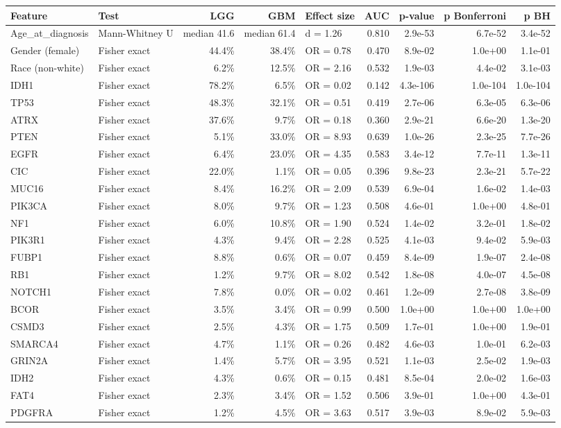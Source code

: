\begin{tabular}{llrrlrrrr}
\toprule
\textbf{Feature} & \textbf{Test} & \textbf{LGG} & \textbf{GBM} & \textbf{Effect size} & \textbf{AUC} & \textbf{p-value} & \textbf{p Bonferroni} & \textbf{p BH} \\
\midrule
Age\_at\_diagnosis & Mann-Whitney U & median 41.6 & median 61.4 & d = 1.26 & 0.810 & 2.9e-53 & 6.7e-52 & 3.4e-52 \\
Gender (female) & Fisher exact & 44.4\% & 38.4\% & OR = 0.78 & 0.470 & 8.9e-02 & 1.0e+00 & 1.1e-01 \\
Race (non-white) & Fisher exact & 6.2\% & 12.5\% & OR = 2.16 & 0.532 & 1.9e-03 & 4.4e-02 & 3.1e-03 \\
IDH1 & Fisher exact & 78.2\% & 6.5\% & OR = 0.02 & 0.142 & 4.3e-106 & 1.0e-104 & 1.0e-104 \\
TP53 & Fisher exact & 48.3\% & 32.1\% & OR = 0.51 & 0.419 & 2.7e-06 & 6.3e-05 & 6.3e-06 \\
ATRX & Fisher exact & 37.6\% & 9.7\% & OR = 0.18 & 0.360 & 2.9e-21 & 6.6e-20 & 1.3e-20 \\
PTEN & Fisher exact & 5.1\% & 33.0\% & OR = 8.93 & 0.639 & 1.0e-26 & 2.3e-25 & 7.7e-26 \\
EGFR & Fisher exact & 6.4\% & 23.0\% & OR = 4.35 & 0.583 & 3.4e-12 & 7.7e-11 & 1.3e-11 \\
CIC & Fisher exact & 22.0\% & 1.1\% & OR = 0.05 & 0.396 & 9.8e-23 & 2.3e-21 & 5.7e-22 \\
MUC16 & Fisher exact & 8.4\% & 16.2\% & OR = 2.09 & 0.539 & 6.9e-04 & 1.6e-02 & 1.4e-03 \\
PIK3CA & Fisher exact & 8.0\% & 9.7\% & OR = 1.23 & 0.508 & 4.6e-01 & 1.0e+00 & 4.8e-01 \\
NF1 & Fisher exact & 6.0\% & 10.8\% & OR = 1.90 & 0.524 & 1.4e-02 & 3.2e-01 & 1.8e-02 \\
PIK3R1 & Fisher exact & 4.3\% & 9.4\% & OR = 2.28 & 0.525 & 4.1e-03 & 9.4e-02 & 5.9e-03 \\
FUBP1 & Fisher exact & 8.8\% & 0.6\% & OR = 0.07 & 0.459 & 8.4e-09 & 1.9e-07 & 2.4e-08 \\
RB1 & Fisher exact & 1.2\% & 9.7\% & OR = 8.02 & 0.542 & 1.8e-08 & 4.0e-07 & 4.5e-08 \\
NOTCH1 & Fisher exact & 7.8\% & 0.0\% & OR = 0.02 & 0.461 & 1.2e-09 & 2.7e-08 & 3.8e-09 \\
BCOR & Fisher exact & 3.5\% & 3.4\% & OR = 0.99 & 0.500 & 1.0e+00 & 1.0e+00 & 1.0e+00 \\
CSMD3 & Fisher exact & 2.5\% & 4.3\% & OR = 1.75 & 0.509 & 1.7e-01 & 1.0e+00 & 1.9e-01 \\
SMARCA4 & Fisher exact & 4.7\% & 1.1\% & OR = 0.26 & 0.482 & 4.6e-03 & 1.0e-01 & 6.2e-03 \\
GRIN2A & Fisher exact & 1.4\% & 5.7\% & OR = 3.95 & 0.521 & 1.1e-03 & 2.5e-02 & 1.9e-03 \\
IDH2 & Fisher exact & 4.3\% & 0.6\% & OR = 0.15 & 0.481 & 8.5e-04 & 2.0e-02 & 1.6e-03 \\
FAT4 & Fisher exact & 2.3\% & 3.4\% & OR = 1.52 & 0.506 & 3.9e-01 & 1.0e+00 & 4.3e-01 \\
PDGFRA & Fisher exact & 1.2\% & 4.5\% & OR = 3.63 & 0.517 & 3.9e-03 & 8.9e-02 & 5.9e-03 \\
\bottomrule
\end{tabular}

